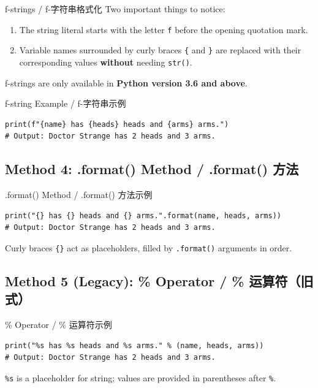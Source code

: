 \documentclass[11pt,a4paper]{report}
\let\oldtexttt\texttt
\renewcommand{\texttt}[1]{\textcolor{mainblue}{\oldtexttt{#1}}}
\begin{document}
\begin{concept}{f-strings / f-字符串格式化}
    Two important things to notice:
    \begin{enumerate}
        \item The string literal starts with the letter \texttt{f} before the opening quotation mark.
        \item Variable names surrounded by curly braces \texttt{\{} and \texttt{\}} are replaced with their corresponding values \textbf{without} needing \texttt{str()}.
    \end{enumerate}
    f-strings are only available in \textbf{Python version 3.6 and above}.
\end{concept}

\begin{examplebox}{f-string Example / f-字符串示例}
\begin{lstlisting}
print(f"{name} has {heads} heads and {arms} arms.")
# Output: Doctor Strange has 2 heads and 3 arms.
\end{lstlisting}
\end{examplebox}

\subsection{Method 4: .format() Method / .format() 方法}

\begin{examplebox}{.format() Method / .format() 方法示例}
\begin{lstlisting}
print("{} has {} heads and {} arms.".format(name, heads, arms))
# Output: Doctor Strange has 2 heads and 3 arms.
\end{lstlisting}
    Curly braces \texttt{\{\}} act as placeholders, filled by \texttt{.format()} arguments in order.
\end{examplebox}

\subsection{Method 5 (Legacy): \% Operator / \% 运算符（旧式）}

\begin{examplebox}{\% Operator / \% 运算符示例}
\begin{lstlisting}
print("%s has %s heads and %s arms." % (name, heads, arms))
# Output: Doctor Strange has 2 heads and 3 arms.
\end{lstlisting}
    \texttt{\%s} is a placeholder for string; values are provided in parentheses after \texttt{\%}.
\end{examplebox}
\end{document}
